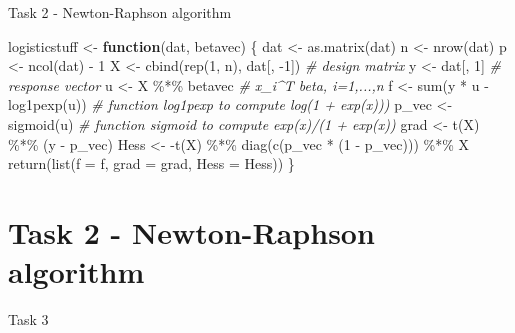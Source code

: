 \documentclass[
  ignorenonframetext,
]{beamer}
\newenvironment{Shaded}{\begin{snugshade}}{\end{snugshade}}
\newcommand{\AttributeTok}[1]{\textcolor[rgb]{0.77,0.63,0.00}{#1}}
\newcommand{\CommentTok}[1]{\textcolor[rgb]{0.56,0.35,0.01}{\textit{#1}}}
\newcommand{\ControlFlowTok}[1]{\textcolor[rgb]{0.13,0.29,0.53}{\textbf{#1}}}
\newcommand{\DecValTok}[1]{\textcolor[rgb]{0.00,0.00,0.81}{#1}}
\newcommand{\FunctionTok}[1]{\textcolor[rgb]{0.00,0.00,0.00}{#1}}
\newcommand{\NormalTok}[1]{#1}
\newcommand{\OtherTok}[1]{\textcolor[rgb]{0.56,0.35,0.01}{#1}}
\newcommand{\SpecialCharTok}[1]{\textcolor[rgb]{0.00,0.00,0.00}{#1}}
\begin{document}
\begin{frame}[fragile]{Task 2 - Newton-Raphson algorithm}
\begin{Shaded}
\begin{Highlighting}[]
\NormalTok{logisticstuff }\OtherTok{\textless{}{-}} \ControlFlowTok{function}\NormalTok{(dat, betavec) \{}
\NormalTok{  dat }\OtherTok{\textless{}{-}} \FunctionTok{as.matrix}\NormalTok{(dat)}
\NormalTok{  n }\OtherTok{\textless{}{-}} \FunctionTok{nrow}\NormalTok{(dat)}
\NormalTok{  p }\OtherTok{\textless{}{-}} \FunctionTok{ncol}\NormalTok{(dat) }\SpecialCharTok{{-}} \DecValTok{1}
\NormalTok{  X }\OtherTok{\textless{}{-}} \FunctionTok{cbind}\NormalTok{(}\FunctionTok{rep}\NormalTok{(}\DecValTok{1}\NormalTok{, n), dat[, }\SpecialCharTok{{-}}\DecValTok{1}\NormalTok{]) }\CommentTok{\# design matrix}
\NormalTok{  y }\OtherTok{\textless{}{-}}\NormalTok{ dat[, }\DecValTok{1}\NormalTok{] }\CommentTok{\# response vector}
\NormalTok{  u }\OtherTok{\textless{}{-}}\NormalTok{ X }\SpecialCharTok{\%*\%}\NormalTok{ betavec }\CommentTok{\# x\_i\^{}T beta, i=1,...,n}
\NormalTok{  f }\OtherTok{\textless{}{-}} \FunctionTok{sum}\NormalTok{(y }\SpecialCharTok{*}\NormalTok{ u }\SpecialCharTok{{-}} \FunctionTok{log1pexp}\NormalTok{(u)) }\CommentTok{\# function \textasciigrave{}log1pexp\textasciigrave{} to compute log(1 + exp(x)))}
\NormalTok{  p\_vec }\OtherTok{\textless{}{-}} \FunctionTok{sigmoid}\NormalTok{(u) }\CommentTok{\# function \textasciigrave{}sigmoid\textasciigrave{} to compute exp(x)/(1 + exp(x))}
\NormalTok{  grad }\OtherTok{\textless{}{-}} \FunctionTok{t}\NormalTok{(X) }\SpecialCharTok{\%*\%}\NormalTok{ (y }\SpecialCharTok{{-}}\NormalTok{ p\_vec)}
\NormalTok{  Hess }\OtherTok{\textless{}{-}} \SpecialCharTok{{-}}\FunctionTok{t}\NormalTok{(X) }\SpecialCharTok{\%*\%} \FunctionTok{diag}\NormalTok{(}\FunctionTok{c}\NormalTok{(p\_vec }\SpecialCharTok{*}\NormalTok{ (}\DecValTok{1} \SpecialCharTok{{-}}\NormalTok{ p\_vec))) }\SpecialCharTok{\%*\%}\NormalTok{ X}
  \FunctionTok{return}\NormalTok{(}\FunctionTok{list}\NormalTok{(}\AttributeTok{f =}\NormalTok{ f, }\AttributeTok{grad =}\NormalTok{ grad, }\AttributeTok{Hess =}\NormalTok{ Hess))}
\NormalTok{\}}
\end{Highlighting}
\end{Shaded}
\end{frame}

\hypertarget{task-2---newton-raphson-algorithm-4}{%
\section{Task 2 - Newton-Raphson
algorithm}\label{task-2---newton-raphson-algorithm-4}}

\begin{frame}{Task 3}
\protect\hypertarget{task-3}{}
\end{frame}
\end{document}
